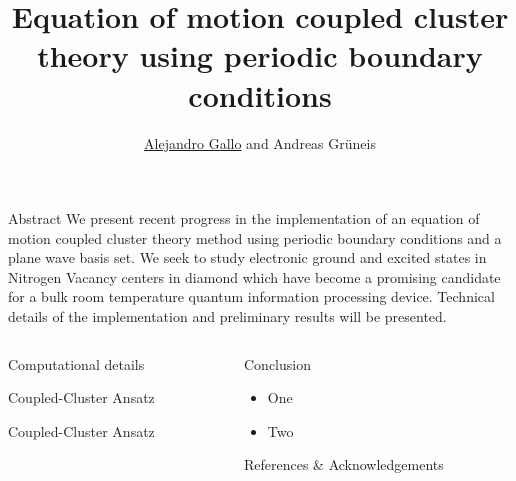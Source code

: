 \documentclass[final]{beamer}
\title{
  Equation of motion coupled cluster theory using periodic boundary conditions
}
\author{\underline{Alejandro Gallo} and Andreas Gr\"uneis}
\institute[]{
  Technical University of Vienna
}
\begin{document}
\begin{frame}[fragile]{}

  \begin{block}{\large Abstract}
    We present recent progress in the implementation of an equation of motion
    coupled cluster theory method using periodic boundary conditions and a plane
    wave basis set.  We seek to study electronic ground and excited states in
    Nitrogen Vacancy centers in diamond which have become a promising candidate
    for a bulk room temperature quantum information processing device. Technical
    details of the implementation and preliminary results will be presented.
  \end{block}
  \begin{columns}[t]
    \begin{column}{.49\linewidth}
      \begin{block}{\large Computational details}
        
      \end{block}
      \begin{block}{\large Coupled-Cluster Ansatz}
        
      \end{block}
      \begin{block}{\large Coupled-Cluster Ansatz}
        
      \end{block}
    \end{column}


    \begin{column}{.49\linewidth}

      \begin{block}{\large Conclusion}
        \begin{itemize}
          \item
            One
          \item
            Two
        \end{itemize}
      \end{block}

      \begin{block}{\large References \& Acknowledgements}
        
        
        
      \end{block}

    \end{column}

  \end{columns}

\end{frame}
\end{document}
